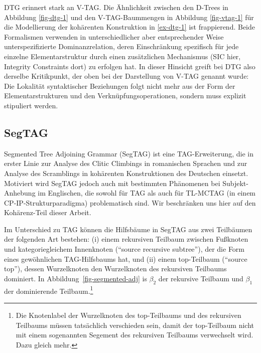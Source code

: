 DTG erinnert stark an V-TAG. Die Ähnlichkeit zwischen den D-Trees in Abbildung \ref{fig-dtg-1} und den V-TAG-Baummengen in Abbildung \ref{fig-vtag-1} für die Modellierung der kohärenten Konstruktion in \ref{ex-dtg-1} ist frappierend. Beide Formalismen verwenden in unterschiedlicher aber entsprechender Weise unterspezifizierte Dominanzrelation, deren Einschränkung spezifisch für jede einzelne Elementarstruktur durch einen zusätzlichen Mechanismus (SIC hier, Integrity Constraints dort) zu erfolgen hat. In dieser Hinsicht greift bei DTG also derselbe Kritikpunkt, der oben bei der Darstellung von V-TAG genannt wurde: Die Lokalität syntaktischer Beziehungen folgt nicht mehr aus der Form der Elementarstrukturen und den Verknüpfungsoperationen, sondern muss explizit stipuliert werden.  



\subsection{SegTAG}

Segmented Tree Adjoining Grammar (SegTAG) ist eine TAG-Erweiterung, die \cite{Kulick:00} in erster Linie zur Analyse des Clitic Climbings in romanischen Sprachen und zur Analyse des Scramblings in kohärenten Konstruktionen des Deutschen einsetzt. Motiviert wird SegTAG jedoch auch mit bestimmten Phänomenen bei Subjekt-Anhebung im Englischen, die sowohl für TAG als auch für TL-MCTAG (in einem CP-IP-Strukturparadigma) problematisch sind. Wir beschränken uns hier auf den Kohärenz-Teil dieser Arbeit.

Im Unterschied zu TAG können die Hilfsbäume in SegTAG aus zwei Teilbäumen der folgenden Art bestehen: (i) einem rekursiven Teilbaum zwischen Fu\ss knoten und kategoriegleichem Innenknoten ("`source recursive subtree"'), der die Form eines gewöhnlichen TAG-Hilfs\-baums hat, und (ii) einem top-Teilbaum ("`source top"'), dessen Wurzelknoten den Wurzelknoten des rekursiven Teilbaums dominiert. In Abbildung~\ref{fig-segmented-adj} is $\beta_2$ der rekursive Teilbaum und $\beta_1$ der dominierende Teilbaum.\footnote{Die Knotenlabel der Wurzelknoten des top-Teilbaums und des rekursiven Teilbaums müssen tatsächlich verschieden sein, damit der top-Teilbaum nicht mit einem sogenannten Segement des rekursiven Teilbaums verwechselt wird. Dazu gleich mehr.}  

